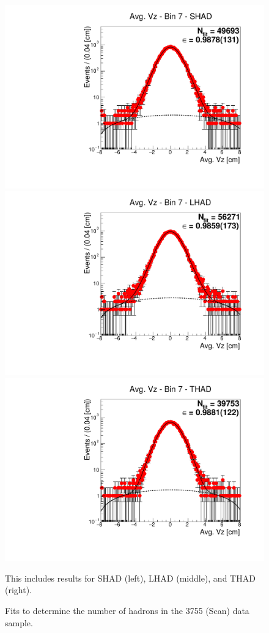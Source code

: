 \begin{figure}[H]
\centering
\includegraphics[scale=0.25]{figures/plots/nonDDbar_fit_results/scan/fit_scan_07_data_SHAD.pdf}
\hspace{-0.5cm}
\includegraphics[scale=0.25]{figures/plots/nonDDbar_fit_results/scan/fit_scan_07_data_LHAD.pdf}
\hspace{-0.5cm}
\includegraphics[scale=0.25]{figures/plots/nonDDbar_fit_results/scan/fit_scan_07_data_THAD.pdf}
\caption{Fits to determine the number of hadrons in the 3755 (Scan) data sample.}
{This includes results for SHAD (left), LHAD (middle), and THAD (right).}
\label{fig:hadron_fits_scan_07}
\end{figure}

